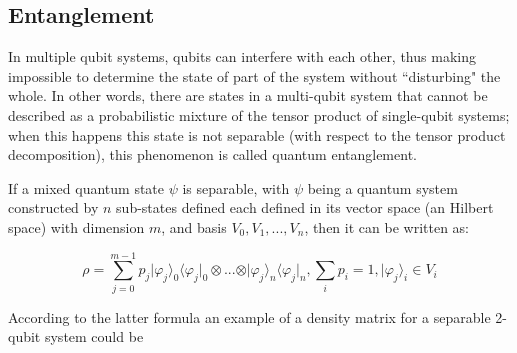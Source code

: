 \begin{comment}
Observables are deemed as the physical properties that can be measured. One way to think of them is to consider the 20 question game, where a two player game where one person thinks of an object and then the second person has a set of 20 "Yes" or "No" to discover the object, one observable could be "Is it red?". With each question the space comprising the possible answers will not increase, this means that asking two times in a row if the object is red in the game will always yield the same answer.
 
Hermitian operators are suitable for being used as observables, as their eigenvalues are real numbers.
The eigenvectors associated with the eigenvalues of the observable will correspond to the state in which the system will be after applying the Hermitian operator. Thus applying an observable to the system can be viewed as doing a projection of the system in the basis formed by the eigenvectors.  
\end{comment}



\subsection{Entanglement}
\label{subsec:entanglement}

In multiple qubit systems, qubits can interfere with each other, thus making impossible to determine the state of part of the system without ``disturbing" the whole. In other words, there are states in a multi-qubit system that cannot be described as a probabilistic mixture of the tensor product of single-qubit systems; when this happens this state is not separable (with respect to the tensor product decomposition), this phenomenon is called quantum entanglement\cite{Rieffel2011}. 

If a mixed quantum state $\psi$ is separable, with $\psi$ being a quantum system constructed by $n$ sub-states defined each defined in its vector space (an Hilbert space) with dimension $m$, and basis $V_{0}, V_{1}, ..., V_{n}$, then it can be written as:


\begin{equation}
\rho= \sum^{m-1}_{j=0}{p_{j}\vert\varphi_{j}\rangle_{0}\langle\varphi_{j}\vert_{0} \otimes ... \otimes \vert\varphi_{j}\rangle_{n}\langle\varphi_{j}\vert_{n}}, \sum_{i}{p_{i}}=1, \vert \varphi_{j} \rangle_{i} \in V_{i}
\end{equation}

According to the latter formula an example of a density matrix for a separable 2-qubit system could be 

